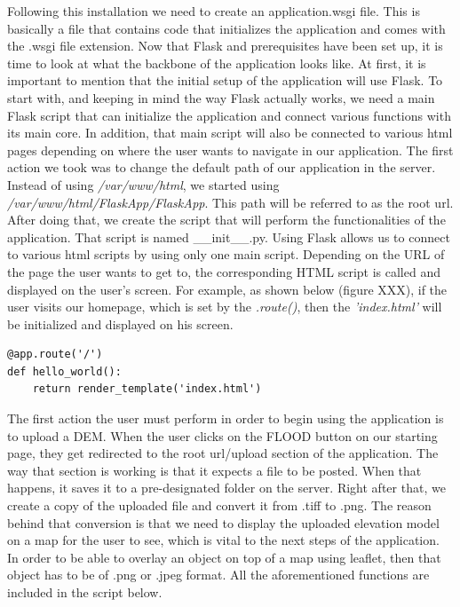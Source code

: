 Following this installation we need to create an application.wsgi file. This is basically a file that contains code that initializes the application and comes with the .wsgi file extension. 
Now that Flask and prerequisites have been set up, it is time to look at what the backbone of the application looks like. At first, it is important to mention that the initial setup of the application will use Flask. To start with, and keeping in mind the way Flask actually works, we need a main Flask script that can initialize the application and connect various functions with its main core. In addition, that main script will also be connected to various html pages depending on where the user wants to navigate in our application.
The first action we took was to change the default path of our application in the server. Instead of using \textit{/var/www/html}, we started using \textit{/var/www/html/FlaskApp/FlaskApp}. This path will be referred to as the root url. After doing that, we create the script that will perform the functionalities of the application. That script is named \_\_init\_\_.py. Using Flask allows us to connect to various html scripts by using  only one main script. Depending on the URL of the page the user wants to get to, the corresponding HTML script is called and displayed on the user's screen. For example, as shown below (figure XXX), if the user visits our homepage, which is set by the \textit{\@app.route()}, then the \textit{'index.html'} will be initialized and displayed on his screen.\\

\begin{lstlisting}
@app.route('/')
def hello_world():
	return render_template('index.html')
\end{lstlisting}

The first action the user must perform in order to begin using the application is to upload a DEM. When the user clicks on the FLOOD button on our starting page, they get redirected to the root url/upload  section of the application. The way that section is working is that it expects a file to be posted. When that happens, it saves it to a pre-designated folder on the server. Right after that, we create a copy of the uploaded file and convert it from .tiff to .png. The reason behind that conversion is that we need to display the uploaded elevation model on a map for the user to see, which is vital to the next steps of the application. In order to be able to overlay an object on top of a map using leaflet, then that object has to be of .png or .jpeg format. All the aforementioned functions are included in the script below.\\


